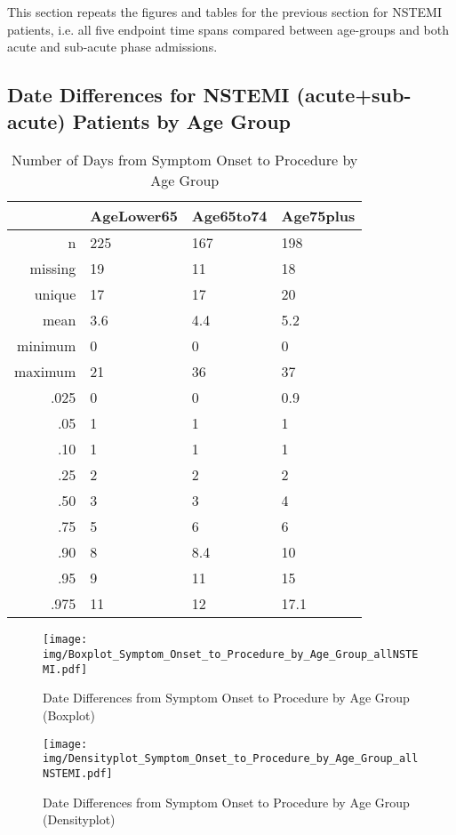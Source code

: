 \documentclass[a4paper]{report}
\begin{document}
\begin{itemize}
{This section repeats the figures and tables for the previous section for NSTEMI patients, i.e. all five endpoint time spans compared between age-groups and both acute and sub-acute phase admissions.


\subsection{Date Differences for NSTEMI (acute+sub-acute) Patients by Age Group}

\begin{table}[ht]
\centering
\begin{tabular}{rlll}
  \toprule
 & AgeLower65 & Age65to74 & Age75plus \\ 
  \midrule
n & 225 & 167 & 198 \\ 
  missing & 19 & 11 & 18 \\ 
  unique & 17 & 17 & 20 \\ 
  mean & 3.6 & 4.4 & 5.2 \\ 
  minimum & 0 & 0 & 0 \\ 
  maximum & 21 & 36 & 37 \\ 
  .025 & 0 & 0 & 0.9 \\ 
  .05 & 1 & 1 & 1 \\ 
  .10 & 1 & 1 & 1 \\ 
  .25 & 2 & 2 & 2 \\ 
  .50 & 3 & 3 & 4 \\ 
  .75 & 5 & 6 & 6 \\ 
  .90 & 8 & 8.4 & 10 \\ 
  .95 & 9 & 11 & 15 \\ 
  .975 & 11 & 12 & 17.1 \\ 
   \bottomrule
\end{tabular}
\caption{Number of Days from Symptom Onset to Procedure by Age Group} 
\end{table}
\begin{figure}
  \centering
  \caption{Date Differences from Symptom Onset to Procedure by Age Group (Boxplot)}
  \label{Boxplot: Date Differences from Symptom Onset to Procedure by Age Group}
\texttt{[image: img/Boxplot\_Symptom\_Onset\_to\_Procedure\_by\_Age\_Group\_allNSTEMI.pdf]}\end{figure}


\begin{figure}
  \centering
  \caption{Date Differences from Symptom Onset to Procedure by Age Group (Densityplot)}
  \label{Density: Date Differences from Symptom Onset to Procedure by Age Group}
\texttt{[image: img/Densityplot\_Symptom\_Onset\_to\_Procedure\_by\_Age\_Group\_allNSTEMI.pdf]}\end{figure}


}
\end{itemize}
\end{document}
